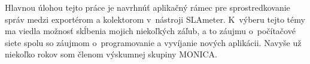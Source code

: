 \documentclass[]{tukediphc}
\begin{document}
Hlavnou úlohou tejto práce je navrhnúť aplikačný rámec pre sprostredkovanie správ medzi exportérom a kolektorom
v~nástroji SLAmeter. K~výberu tejto témy ma viedla možnosť skĺbenia mojich niekoľkých záľub, a to 
záujmu o~počítačové siete spolu so záujmom o~programovanie a vyvíjanie nových aplikácii. Navyše už niekoľko 
rokov som členom výskumnej skupiny MONICA.

\kpredhovoru

\pagestyle{empty}
\tableofcontents
\newpage

\pagestyle{empty}
\listoffigures
\newpage

\pagestyle{empty}
\listoftables
\newpage

\pagestyle{empty}
\printglossary %
\newpage

\slovnikterminov
\end{document}
